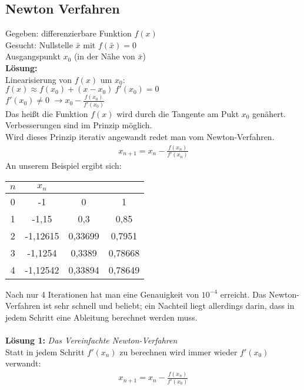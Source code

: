 \documentclass{scrartcl}
\begin{document}
\subsection{Newton Verfahren}
Gegeben: differenzierbare Funktion $f(x)$\\
Gesucht: Nullstelle $\bar{x}$ mit $f(\bar{x})=0$\\
Ausgangspunkt $x_0$ (in der Nähe von $\bar{x}$)\\
\textbf{Lösung:}\\
Linearisierung von $f(x)$ um $x_0$:\\
$f(x) \approx f(x_0)+(x-x_0) \ f'(x_0) = 0$\\
$f'(x_0) \neq 0$
$\rightarrow x_0 - \frac{f(x_0)}{f'(x_0)}$\\
Das heißt die Funktion $f(x)$ wird durch die Tangente am Pukt $x_0$ genähert. Verbesserungen sind im Prinzip möglich.\\
Wird dieses Prinzip iterativ angewandt redet man vom Newton-Verfahren.
\begin{align*}
x_{n+1} =x_{n} - \frac{f(x_n)}{f'(x_n)}
\end{align*}
An unserem Beispiel ergibt sich:
\begin{center}
\begin{tabular}{|c|c|c|c|}
\hline 
$n$ & $x_n$ &  &  \\ 
\hline
0 & -1 & 0 & 1 \\ 

1 & -1,15 & 0,3 & 0,85 \\ 

2 & -1,12615 & 0,33699 & 0,7951 \\ 

3 & -1,1254 & 0,3389 & 0,78668 \\ 

4 & -1,12542 & 0,33894 & 0,78649 \\ 
\hline 
\end{tabular} 
\end{center}
Nach nur 4 Iterationen hat man eine Genauigkeit von $10^{-4}$ erreicht.
Das Newton-Verfahren ist sehr schnell und beliebt; ein Nachteil liegt allerdings darin, dass in jedem Schritt eine Ableitung berechnet werden muss.\\
\\
\textbf{Lösung 1:} \textit{Das Vereinfachte Newton-Verfahren}\\
Statt in jedem Schritt $f'(x_n)$ zu berechnen wird immer wieder $f'(x_0)$ verwandt:
\begin{align*}
x_{n+1}=x_n-\frac{f(x_n)}{f'(x_0)}
\end{align*}
\end{document}
